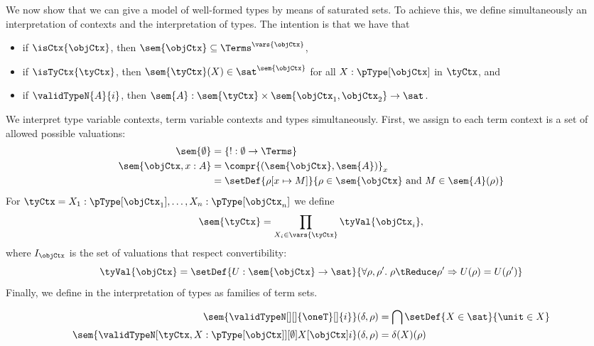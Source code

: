 \documentclass[preprint]{sigplanconf}
\begin{document}
We now show that we can give a model of well-formed types by means of saturated
sets.
To achieve this, we define simultaneously an interpretation of contexts and the
interpretation of types.
The intention is that we have that
\begin{itemize}
\item if $\isCtx{\objCtx}$, then
  $\sem{\objCtx} \subseteq \Terms^{\vars{\objCtx}}$,
\item if $\isTyCtx{\tyCtx}$, then
  $\sem{\tyCtx}(X) \in \sat^{\sem{\objCtx}}$ for
  all $X : \pType[\objCtx]$ in $\tyCtx$, and
\item if $\validTypeN{A}{i}$, then
  $\sem{A} : \sem{\tyCtx} \times \sem{\objCtx_1, \objCtx_2} \to \sat$.
\end{itemize}

\begin{definition}[Interpretations]
  \label{def:interpretation}
  We interpret type variable contexts, term variable contexts and
  types simultaneously.
  First, we assign to each term context is a set of allowed possible
  valuations:
  \begin{align*}
    \sem{\emptyset} & = \{! : \emptyset \to \Terms\} \\
    \sem{\objCtx, x : A} & =
    \compr{(\sem{\objCtx}, \sem{A})}_x \\
    & = \setDef{\rho[x \mapsto M]}{
      \rho \in \sem{\objCtx} \text{ and } M \in \sem{A}(\rho)}
\end{align*}
  For $\tyCtx = X_1 : \pType[\objCtx_1], \dotsc, X_n : \pType[\objCtx_n]$ we
  define
  \begin{align*}
    \sem{\tyCtx} = \prod_{X_i \in \vars{\tyCtx}} \tyVal{\objCtx_i},
  \end{align*}
  where $I_\objCtx$ is the set of valuations that respect convertibility:
  \begin{equation*}
\tyVal{\objCtx} =
    \setDef{U : \sem{\objCtx} \to \sat}{
      \forall \rho, \rho'. \; \rho \tReduce \rho' \Rightarrow U(\rho) = U(\rho')}
  \end{equation*}
  Finally, we define in  the interpretation of
  types as families of term sets.
  \begin{figure*}
  \begin{align*}
    \sem{\validTypeN[][]{\oneT}[]{i}}(\delta, \rho)
    & = \bigcap \setDef{X \in \sat}{\unit \in X} \\
    \sem{\validTypeN[\tyCtx, X : {\pType[\objCtx]}][\emptyset]{X}[\objCtx]{i}}
    (\delta, \rho)
    & = \delta(X)(\rho) \\

\end{align*}
\end{figure*}
\end{definition}
\end{document}
